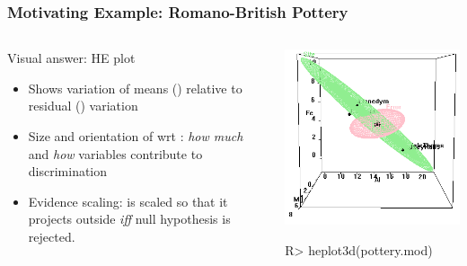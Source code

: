 \begin{frame}[containsverbatim]
	\frametitle{Motivating Example: Romano-British Pottery}
\begin{columns}[c]
 \begin{column}{0.5\textwidth}
  \begin{block}{Visual answer: HE plot}
  \begin{itemize}
  	\item Shows variation of means () relative to residual
  	() variation
  	\item Size and orientation of  wrt : \emph{how much}
  	and \emph{how} variables contribute to discrimination
  	\item Evidence scaling:  is scaled so that it projects
  	outside  \emph{iff} null hypothesis is rejected.
	\end{itemize}
 \end{block}
  \href{run:powerpoint.bat}{}
 \end{column}
 \begin{column}{0.5\textwidth}
 	\includegraphics[width=\textwidth,clip]{fig/pottery0-3d}
  \begin{CodeInput}
  R> heplot3d(pottery.mod)
  \end{CodeInput}
 \end{column}
\end{columns}
	
\end{frame}

